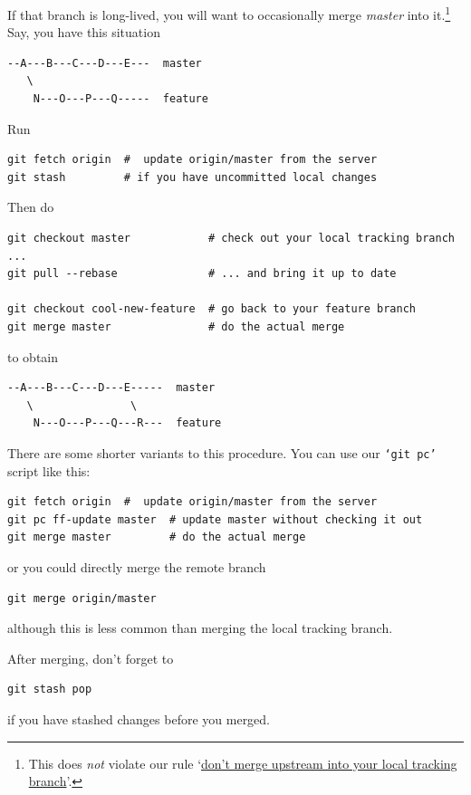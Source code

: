 \documentclass[12pt,pdftex]{article}
\begin{document}
\bigskip

If that branch is long-lived, you will want to occasionally merge
\emph{master} into it.\footnote{This does \emph{not} violate our rule
`\hyperref[sec-5-1]{don't merge upstream into your local tracking branch}'.}
Say, you have this situation
\begin{verbatim}
--A---B---C---D---E---  master
   \
    N---O---P---Q-----  feature
\end{verbatim}
Run
\lstset{frame=single,basicstyle=\ttfamily\footnotesize,language=sh,label= ,caption= ,captionpos=b,numbers=none}
\begin{lstlisting}
git fetch origin  #  update origin/master from the server
git stash         # if you have uncommitted local changes
\end{lstlisting}

Then do
\lstset{frame=single,basicstyle=\ttfamily\footnotesize,language=sh,label= ,caption= ,captionpos=b,numbers=none}
\begin{lstlisting}
git checkout master            # check out your local tracking branch ...
git pull --rebase              # ... and bring it up to date

git checkout cool-new-feature  # go back to your feature branch
git merge master               # do the actual merge
\end{lstlisting}
to obtain
\begin{verbatim}
--A---B---C---D---E-----  master
   \               \
    N---O---P---Q---R---  feature
\end{verbatim}


There are some shorter variants to this procedure. You can use our
\texttt{‘git pc’} script like this:
\lstset{frame=single,basicstyle=\ttfamily\footnotesize,language=sh,label= ,caption= ,captionpos=b,numbers=none}
\begin{lstlisting}
git fetch origin  #  update origin/master from the server
git pc ff-update master  # update master without checking it out
git merge master         # do the actual merge
\end{lstlisting}
or you could directly merge the remote branch
\lstset{frame=single,basicstyle=\ttfamily\footnotesize,language=sh,label= ,caption= ,captionpos=b,numbers=none}
\begin{lstlisting}
git merge origin/master
\end{lstlisting}
although this is less common than merging the local tracking branch.

After merging, don't forget to
\lstset{frame=single,basicstyle=\ttfamily\footnotesize,language=sh,label= ,caption= ,captionpos=b,numbers=none}
\begin{lstlisting}
git stash pop
\end{lstlisting}
if you have stashed changes before you merged.
\end{document}
